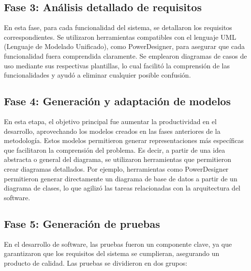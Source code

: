 \documentclass[lettersize,journal]{IEEEtran}
\begin{document}
       	\subsection{Fase 3: Análisis detallado de requisitos}
       	
       	En esta fase, para cada funcionalidad del sistema, se detallaron los requisitos correspondientes. Se utilizaron herramientas compatibles con el lenguaje UML (Lenguaje de Modelado Unificado), como PowerDesigner, para asegurar que cada funcionalidad fuera comprendida claramente. Se emplearon diagramas de casos de uso mediante sus respectivas plantillas, lo cual facilitó la comprensión de las funcionalidades y ayudó a eliminar cualquier posible confusión.
       	
       	
       	
       	
       	\subsection{Fase 4: Generación y adaptación de modelos}
       	
       	En esta etapa, el objetivo principal fue aumentar la productividad en el desarrollo, aprovechando los modelos creados en las fases anteriores de la metodología. Estos modelos permitieron generar representaciones más específicas que facilitaron la comprensión del problema. Es decir, a partir de una idea abstracta o general del diagrama, se utilizaron herramientas que permitieron crear diagramas detallados. Por ejemplo, herramientas como PowerDesigner permitieron generar directamente un diagrama de base de datos a partir de un diagrama de clases, lo que agilizó las tareas relacionadas con la arquitectura del software.
       	
       	\subsection{Fase 5: Generación de pruebas}
       	
       	En el desarrollo de software, las pruebas fueron un componente clave, ya que garantizaron que los requisitos del sistema se cumplieran, asegurando un producto de calidad. Las pruebas se dividieron en dos grupos:
       	
\end{document}
